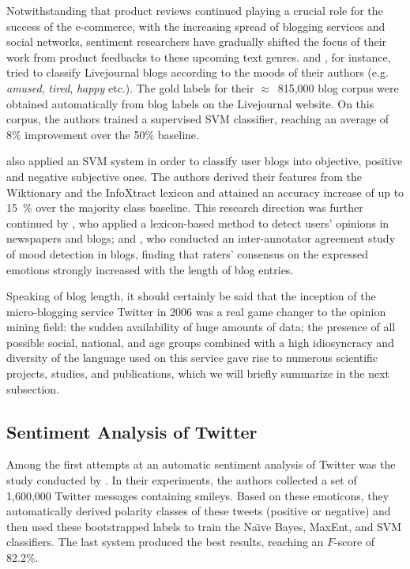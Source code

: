 
Notwithstanding that product reviews continued playing a crucial role
for the success of the e-commerce, with the increasing spread of
blogging services and social networks, sentiment researchers have
gradually shifted the focus of their work from product feedbacks to
these upcoming text genres.  \citet{Mishne:05} and \citet{Mishne:07},
for instance, tried to classify Livejournal blogs according to the
moods of their authors (e.g.  \emph{amused}, \emph{tired},
\emph{happy} etc.).  The gold labels for their $\approx$~815,000 blog
corpus were obtained automatically from blog labels on the Livejournal
website.  On this corpus, the authors trained a supervised SVM
classifier, reaching an average of 8\% improvement over the 50\%
baseline.

\citet{Chesley:06} also applied an SVM system in order to classify
user blogs into objective, positive and negative subjective ones.  The
authors derived their features from the Wiktionary and the InfoXtract
lexicon \citep{Srihari:03} and attained an accuracy increase of up to
15~\% over the majority class baseline.  This research direction was
further continued by \citet{Godbole:07}, who applied a lexicon-based
method to detect users' opinions in newspapers and blogs; and
\citet{Gill:08}, who conducted an inter-annotator agreement study of
mood detection in blogs, finding that raters' consensus on the
expressed emotions strongly increased with the length of blog entries.

Speaking of blog length, it should certainly be said that the
inception of the micro-blogging service Twitter in 2006 was a real
game changer to the opinion mining field: the sudden availability of
huge amounts of data; the presence of all possible social, national,
and age groups combined with a high idiosyncracy and diversity of the
language used on this service gave rise to numerous scientific
projects, studies, and publications, which we will briefly summarize
in the next subsection.

\subsection{Sentiment Analysis of Twitter}

Among the first attempts at an automatic sentiment analysis of Twitter
was the study conducted by \citet{Go:09}.  In their experiments, the
authors collected a set of 1,600,000 Twitter messages containing
smileys.  Based on these emoticons, they automatically derived
polarity classes of these tweets (positive or negative) and then used
these bootstrapped labels to train the Na\"{\i}ve Bayes, MaxEnt, and
SVM classifiers.  The last system produced the best results, reaching
an $F$-score of 82.2\%.

